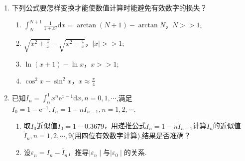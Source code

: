 \documentclass[a4paper]{article}
\begin{document}
\begin{enumerate}
  \item 下列公式要怎样变换才能使数值计算时能避免有效数字的损失？
  \begin{enumerate}[label=（\arabic*）]
    \item $\int_N^{N+1}\frac{1}{1+x^2}\mathrm{d}x=\arctan(N+1)-\arctan N$，$N>>1$;
    \item $\sqrt{x^2+\frac{1}{x}}-\sqrt{x^2-\frac{1}{x}}$，$|x|>>1$;
    \item $\ln(x+1)-\ln x$，$x>>1$;
    \item $\cos^2x-\sin^2x$，$x\approx\frac{\pi}{4}$
  \end{enumerate}

  \item 已知$I_n=\int_0^1x^n\mathrm{e}^{x-1}\mathrm{d}x,n=0,1,\cdots$,满足$I_0=1-\mathrm{e}^{-1},I_n=1-nI_{n-1},n=1,2,\cdots$.
  \begin{enumerate}[label=（\arabic*）]
    \item 取$I_0$近似值$\tilde{I}_{0}=1-0.3679$，用递推公式$\tilde{I}_{n}=1-n\tilde{I}_{n-1}$计算$I_n$的近似值$\tilde{I}_n,n=1,2,\cdots ,9$(用四位有效数字计算),结果是否准确？
    \item 设$\varepsilon_n=I_n-\bar{I}_n$，推导$\mid\varepsilon_n\mid$与$\mid\varepsilon_0\mid$的关系.
  \end{enumerate}

\end{enumerate}
\end{document}
